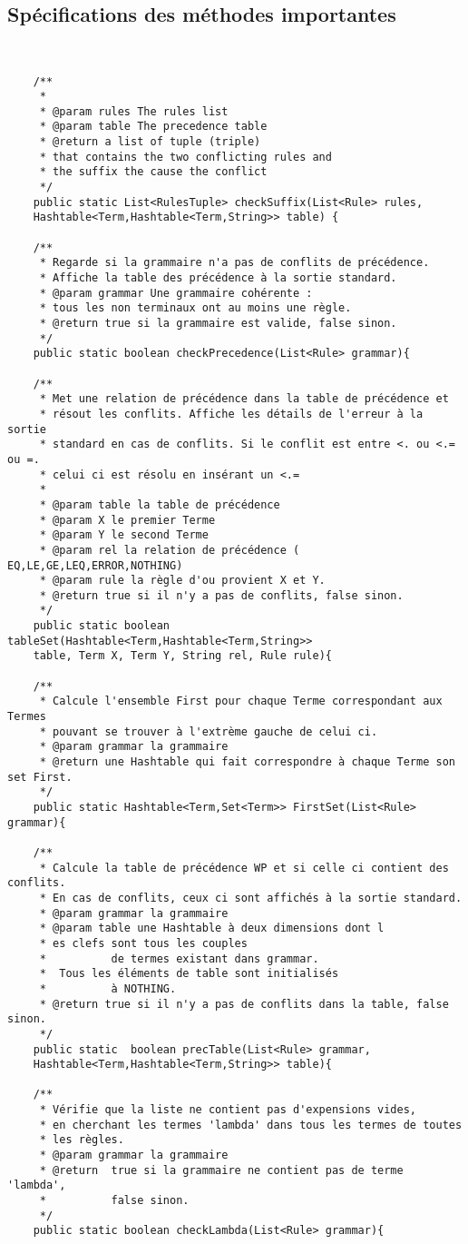 	\subsection{Spécifications des méthodes importantes}
{\small
\begin{verbatim}


 	/**
	 * 
	 * @param rules The rules list
	 * @param table The precedence table
	 * @return a list of tuple (triple) 
	 * that contains the two conflicting rules and 
	 * the suffix the cause the conflict
	 */
	public static List<RulesTuple> checkSuffix(List<Rule> rules, 
	Hashtable<Term,Hashtable<Term,String>> table) {
	
	/**
	 * Regarde si la grammaire n'a pas de conflits de précédence.
	 * Affiche la table des précédence à la sortie standard.
	 * @param grammar Une grammaire cohérente : 
	 * tous les non terminaux ont au moins une règle. 
	 * @return true si la grammaire est valide, false sinon.
	 */
	public static boolean checkPrecedence(List<Rule> grammar){
	
	/**
	 * Met une relation de précédence dans la table de précédence et
	 * résout les conflits. Affiche les détails de l'erreur à la sortie
	 * standard en cas de conflits. Si le conflit est entre <. ou <.= ou =. 
	 * celui ci est résolu en insérant un <.= 
	 * 
	 * @param table la table de précédence
	 * @param X	le premier Terme
	 * @param Y le second Terme
	 * @param rel la relation de précédence ( EQ,LE,GE,LEQ,ERROR,NOTHING)
	 * @param rule la règle d'ou provient X et Y.
	 * @return true si il n'y a pas de conflits, false sinon. 
	 */
	public static boolean tableSet(Hashtable<Term,Hashtable<Term,String>> 
	table, Term X, Term Y, String rel, Rule rule){
	
	/**
	 * Calcule l'ensemble First pour chaque Terme correspondant aux Termes
	 * pouvant se trouver à l'extrème gauche de celui ci. 
	 * @param grammar la grammaire
	 * @return une Hashtable qui fait correspondre à chaque Terme son set First.
	 */
	public static Hashtable<Term,Set<Term>> FirstSet(List<Rule> grammar){
	
	/**
	 * Calcule la table de précédence WP et si celle ci contient des conflits.
	 * En cas de conflits, ceux ci sont affichés à la sortie standard.
	 * @param grammar la grammaire
	 * @param table une Hashtable à deux dimensions dont l
	 * es clefs sont tous les couples
	 * 			de termes existant dans grammar. 
	 *  Tous les éléments de table sont initialisés
	 * 			à NOTHING.
	 * @return true si il n'y a pas de conflits dans la table, false sinon. 
	 */
	public static  boolean precTable(List<Rule> grammar, 
	Hashtable<Term,Hashtable<Term,String>> table){
	
	/**
	 * Vérifie que la liste ne contient pas d'expensions vides,
	 * en cherchant les termes 'lambda' dans tous les termes de toutes
	 * les règles. 
	 * @param grammar la grammaire
	 * @return  true si la grammaire ne contient pas de terme 'lambda',
	 * 			false sinon.
	 */
	public static boolean checkLambda(List<Rule> grammar){


\end{verbatim}
}
